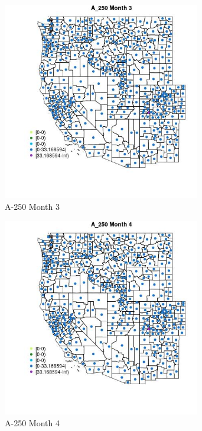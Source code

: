 \begin{figure} 
\centering  
\includegraphics[width=0.77\textwidth]{Code_Outputs/df_report_ML_predictors_CountyCentroid_Locations_Dates_2008-01-01to2018-12-31_MapObsMo3A_250.jpg} 
\caption{\label{fig:df_report_ML_predictors_CountyCentroid_Locations_Dates_2008-01-01to2018-12-31MapObsMo3A_250}A-250 Month 3} 
\end{figure} 
 

\begin{figure} 
\centering  
\includegraphics[width=0.77\textwidth]{Code_Outputs/df_report_ML_predictors_CountyCentroid_Locations_Dates_2008-01-01to2018-12-31_MapObsMo4A_250.jpg} 
\caption{\label{fig:df_report_ML_predictors_CountyCentroid_Locations_Dates_2008-01-01to2018-12-31MapObsMo4A_250}A-250 Month 4} 
\end{figure} 
 

